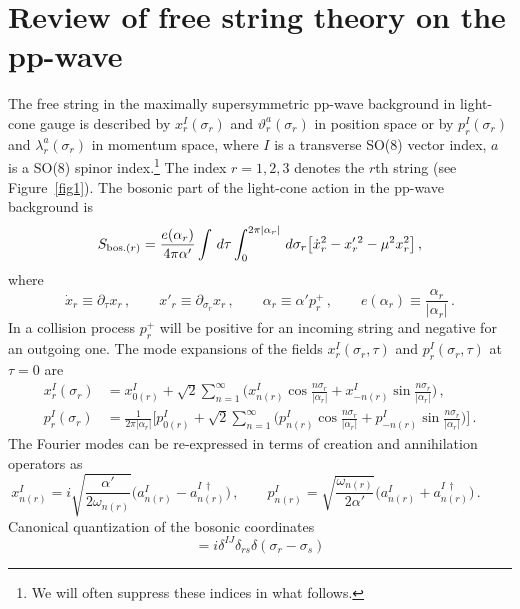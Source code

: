 \documentclass[12pt]{article}
\def\a{\alpha}
\def\d{\delta}
\def\m{\mu}
\def\s{\sigma}
\def\l{\lambda}
\def\t{\tau}
\def\o{\omega}
\def\vt{\vartheta}
\def\p{\partial}
\def\dg{\dagger}
\numberwithin{equation}{section} \setlength{\textwidth}{17cm}
\begin{document}
\section{Review of free string theory on the pp-wave}\label{sec2}
The free string in the maximally supersymmetric pp-wave background in
light-cone gauge is described by $x^I_r(\s_r)$ and $\vt^a_r(\s_r)$ in position space or
by $p^I_r(\s_r)$ and $\l^a_r(\s_r)$ in momentum space, where $I$ is a transverse
SO(8) vector index, $a$ is a SO(8) spinor index.\footnote{We will often suppress these
indices in what follows.} The index $r=1,2,3$ denotes the $r$th
string (see Figure~\ref{fig1}). The bosonic part of the light-cone action in the pp-wave
background is~\cite{m}
\begin{equation}
S_{\mbox{\scriptsize bos.}(r)}=\frac{e(\a_r)}{4\pi\a'}\int\,d\t\int_0^{2\pi|\a_r|}
\,d\s_r\bigl[\dot{x}_r^2-x^{\prime\,2}_r-\m^2x_r^2\bigr]\,,
\end{equation}
where
\begin{equation}
\dot{x}_r\equiv\p_{\t}x_r\,,\qquad x'_r\equiv\p_{\s_r}x_r\,,\qquad
\a_r\equiv\a'p^+_r\,,\qquad e(\a_r)\equiv\frac{\a_r}{|\alpha_r|}\,.
\end{equation}
In a collision process $p^+_r$ will be positive for an incoming string and
negative for an outgoing one.
The mode expansions of the fields $x_r^I(\s_r,\t)$ and $p_r^I(\s_r,\t)$ at $\t=0$
are
\begin{equation}
\begin{split}
x_r^I(\s_r)& = x_{0(r)}^I+\sqrt{2}\sum_{n=1}^{\infty}
\bigl(x_{n(r)}^I\cos\frac{n\s_r}{|\a_r|}+x_{-n(r)}^I\sin\frac{n\s_r}{|\a_r|}\bigr)\,,\\
p_r^I(\s_r) & =\frac{1}{2\pi|\a_r|}\bigl[p_{0(r)}^I+\sqrt{2}\sum_{n=1}^{\infty}
\bigl(p_{n(r)}^I\cos\frac{n\s_r}{|\a_r|}+p_{-n(r)}^I\sin\frac{n\s_r}{|\a_r|}\bigr)\bigr]\,.
\end{split}
\end{equation}
The Fourier modes can be re-expressed in terms of creation and
annihilation operators as
\begin{equation}\label{xp}
x_{n(r)}^I=i\sqrt{\frac{\a'}{2\o_{n(r)}}}\bigl(a_{n(r)}^I-a_{n(r)}^{I\,\dg}\bigr)\,,\qquad
p_{n(r)}^I=\sqrt{\frac{\o_{n(r)}}{2\a'}}\bigl(a_{n(r)}^I+a_{n(r)}^{I\,\dg}\bigr)\,.\qquad
\end{equation}
Canonical quantization of the bosonic coordinates
\begin{equation}
[x_r^I(\s_r),p_s^J(\s_s)]=i\d^{IJ}\d_{rs}\d(\s_r-\s_s)
\end{equation}
\end{document}
